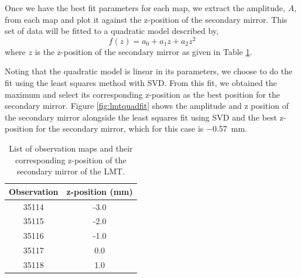 Once we have the best fit parameters for each map, we extract the amplitude, $A$, from each map and plot it against the z-position of the secondary mirror. This set of data will be fitted to a quadratic model described by,
\begin{equation}
    f(z)=a_0+a_1z+a_2z^2
\end{equation}
where $z$ is the z-position of the secondary mirror as given in Table \ref{tab:LMTmaps}. 

Noting that the quadratic model is linear in its parameters, we choose to do the fit using the least squares method with SVD. From this fit, we obtained the maximum and select its corresponding z-position as the best position for the secondary mirror. Figure \ref{fig:lmtquadfit} shows the amplitude and z position of the secondary mirror alongside the least squares fit using SVD and the best z-position for the secondary mirror, which for this case is \SI{-0.57}{\milli\m}.




\begin{table}[ht]
    \centering
    \begin{tabular}{|c|c|}
        \toprule
         Observation  & z-position (mm)  \\
         \midrule
         35114 & -3.0\\
         35115 & -2.0 \\
         35116 & -1.0 \\
         35117 & 0.0 \\
         35118 & 1.0\\
         \bottomrule
    \end{tabular}
    \caption{List of observation maps and their corresponding z-position of the secondary mirror of the LMT.}
    \label{tab:LMTmaps}
\end{table}

